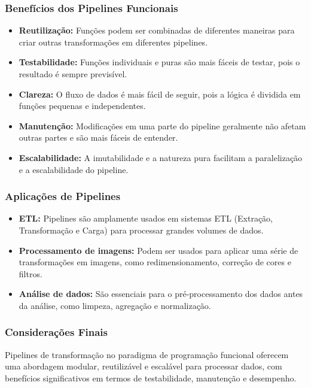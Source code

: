 \subsubsection{Benefícios dos Pipelines Funcionais}
\begin{itemize}
    \item \textbf{Reutilização:} Funções podem ser combinadas de diferentes maneiras para criar outras transformações em diferentes pipelines.
    \item \textbf{Testabilidade:} Funções individuais e puras são mais fáceis de testar, pois o resultado é sempre previsível.
    \item \textbf{Clareza:} O fluxo de dados é mais fácil de seguir, pois a lógica é dividida em funções pequenas e independentes.
    \item \textbf{Manutenção:} Modificações em uma parte do pipeline geralmente não afetam outras partes e são mais fáceis de entender.
    \item \textbf{Escalabilidade:} A imutabilidade e a natureza pura facilitam a paralelização e a escalabilidade do pipeline.
\end{itemize}

\subsubsection{Aplicações de Pipelines}
\begin{itemize}
    \item \textbf{ETL:} Pipelines são amplamente usados em sistemas ETL (Extração, Transformação e Carga) para processar grandes volumes de dados.
    \item \textbf{Processamento de imagens:} Podem ser usados para aplicar uma série de transformações em imagens, como redimensionamento, correção de cores e filtros.
    \item \textbf{Análise de dados:} São essenciais para o pré-processamento dos dados antes da análise, como limpeza, agregação e normalização.
\end{itemize}

\subsubsection*{Considerações Finais}
Pipelines de transformação no paradigma de programação funcional oferecem uma abordagem modular, reutilizável e escalável para processar dados, com benefícios significativos em termos de testabilidade, manutenção e desempenho.

